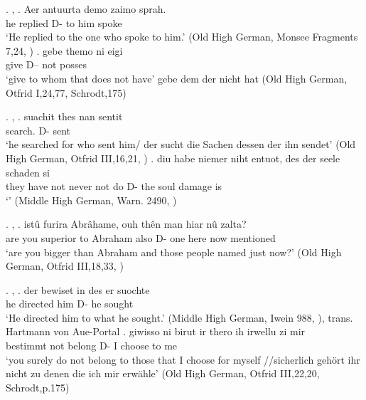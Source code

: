 \ex. , 
\ag. Aer antuurta demo zaimo sprah.\\
he replied\scsub{[dat]} D- {to him} spoke\scsub{[nom]}\\
`He replied to the one who spoke to him.' \hfill (Old High German, Monsee Fragments 7,24, \citealt[761]{behaghel1923})
\bg. gebe themo ni eigi\\
 give\scsub{[dat]} D-- not posses\scsub{[nom]}\\
 `give to whom that does not have' gebe dem der nicht hat \hfill (Old High German, Otfrid I,24,77, Schrodt,175)

\ex. , 
\ag. suachit thes nan sentit\\
 search. D-  sent\\
 `he searched for who sent him/ der sucht die Sachen dessen der ihn sendet' \hfill (Old High German, Otfrid III,16,21, \citealt[761]{behaghel1923})
\bg. diu habe niemer niht entuot, des der seele schaden si\\
 they have not never {not do} D- the soul damage is\scsub{[nom]}\\
 `' \hfill (Middle High German, Warn. 2490, \citealt[761]{behaghel1923})

\ex. , 
\ag. istû furira Abrâhame, ouh thên man hiar nû zalta?\\
 {are you} {superior to}\scsub{[dat]} Abraham also D- one here now mentioned\scsub{[acc]}\\
 `are you bigger than Abraham and those people named just now?' \hfill (Old High German, Otfrid III,18,33, \citealt[761]{behaghel1923})

\ex. , 
\ag. der bewiset in des er suochte\\
 he directed\scsub{[gen]} him D- he sought\scsub{[acc]}\\
 `He directed him to what he sought.' \hfill (Middle High German, Iwein 988, \citealt[761]{behaghel1923}), trans. Hartmann von Aue-Portal
\bg. giwisso ni birut ir thero ih irwellu zi mir\\
 bestimmt not belong\scsub{[gen]}  D- I choose\scsub{[acc]} to me\\
 `you surely do not belong to those that I choose for myself //sicherlich gehört ihr nicht zu denen die ich mir erwähle' \hfill (Old High German, Otfrid III,22,20, Schrodt,p.175)

